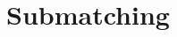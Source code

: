 \documentclass[10pt,a4paper,german,headsepline,twoside,DIV15,BCOR12mm]{scrbook}
\theoremstyle{definition}
\begin{document}


\chapter{Submatching}






\nowebchunks



\end{document}
